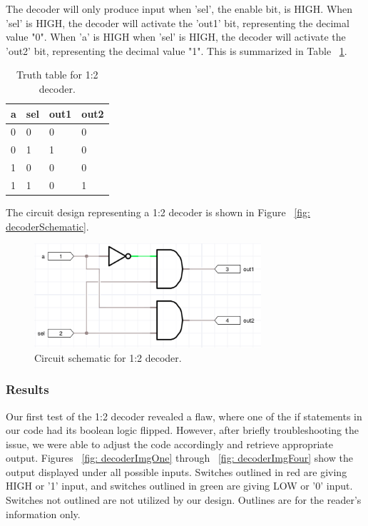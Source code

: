 \documentclass[11pt]{article}
\begin{document}
The decoder will only produce input when 'sel', the enable bit, is HIGH. When 'sel' is HIGH, the decoder will activate the 'out1' bit, representing the decimal value "0". When 'a' is HIGH when 'sel' is HIGH, the decoder will activate the 'out2' bit, representing the decimal value "1". This is summarized in Table ~\ref{tab:decoderTruthTable}.

\begin{table}[h]
\begin{center}
	\begin{tabular}{| l | l | l | l |}
		\hline
		a & sel & out1 & out2 \\ \hline
		0 & 0 & 0 & 0 \\ \hline
		0 & 1 & 1 & 0 \\ \hline
		1 & 0 & 0 & 0 \\ \hline
		1 & 1 & 0 & 1 \\ \hline
	\end{tabular}
	\caption{\label{tab:decoderTruthTable} Truth table for 1:2 decoder.}
	\label{tab:decoderTruthTable}
\end{center}
\end{table}

The circuit design representing a 1:2 decoder is shown in Figure ~\ref{fig: decoderSchematic}.

\begin{figure}[H]
\begin{center}
	\includegraphics[width=0.75\textwidth]{report-images/img3.png}
	\caption{\label{fig: decoderSchematic} Circuit schematic for 1:2 decoder.}
	\label{fig:decoderSchematic}
\end{center}
\end{figure}

\subsubsection{Results}

Our first test of the 1:2 decoder revealed a flaw, where one of the if statements in our code had its boolean logic flipped. However, after briefly troubleshooting the issue, we were able to adjust the code accordingly and retrieve appropriate output. Figures ~\ref{fig: decoderImgOne} through ~\ref{fig: decoderImgFour} show the output displayed under all possible inputs. Switches outlined in red are giving HIGH or '1' input, and switches outlined in green are giving LOW or '0' input. Switches not outlined are not utilized by our design. Outlines are for the reader's information only.
\end{document}
